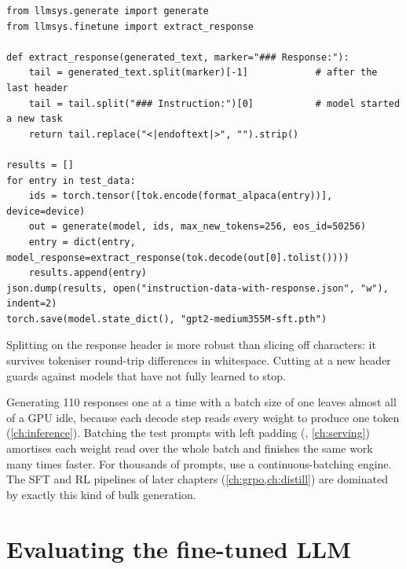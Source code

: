 \begin{lstlisting}[caption={Generating, extracting and saving test responses.},label={lst:instruct:extract}]
from llmsys.generate import generate
from llmsys.finetune import extract_response

def extract_response(generated_text, marker="### Response:"):
    tail = generated_text.split(marker)[-1]            # after the last header
    tail = tail.split("### Instruction:")[0]           # model started a new task
    return tail.replace("<|endoftext|>", "").strip()

results = []
for entry in test_data:
    ids = torch.tensor([tok.encode(format_alpaca(entry))], device=device)
    out = generate(model, ids, max_new_tokens=256, eos_id=50256)
    entry = dict(entry, model_response=extract_response(tok.decode(out[0].tolist())))
    results.append(entry)
json.dump(results, open("instruction-data-with-response.json", "w"), indent=2)
torch.save(model.state_dict(), "gpt2-medium355M-sft.pth")
\end{lstlisting}

Splitting on the response header is more robust than slicing off 
characters: it survives tokeniser round-trip differences in whitespace. Cutting at a
new  header guards against models that have not fully
learned to stop.

\begin{systemslens}
Generating 110 responses one at a time with a batch size of one leaves almost all of a
GPU idle, because each decode step reads every weight to produce one token
(\cref{ch:inference}). Batching the test prompts with left padding
(, \cref{ch:serving}) amortises each weight read over the whole
batch and finishes the same work many times faster. For thousands of prompts, use a
continuous-batching engine. The SFT and RL pipelines of later chapters
(\cref{ch:grpo,ch:distill}) are dominated by exactly this kind of bulk generation.
\end{systemslens}

\section{Evaluating the fine-tuned LLM}\label{sec:instruct:eval}

